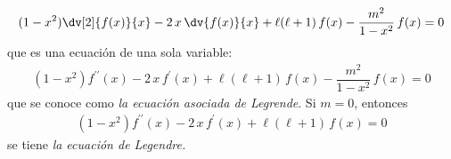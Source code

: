 \begin{align*}
(1 - x^{2}) \dv[2]{f(x)}{x} - 2 \, x \, \dv{f(x)}{x} + \ell (\ell +1 ) \, f(x)  - \dfrac{m^{2}}{1 - x^{2}} \, f(x) = 0
\end{align*}
que es una ecuación de una sola variable:
\begin{align*}
(1 - x^{2}) f^{\prime \prime}(x) - 2 \, x \, f^{\prime}(x) + \ell (\ell +1 ) \, f(x)  - \dfrac{m^{2}}{1 - x^{2}} \, f(x) = 0
\end{align*}
que se conoce como \emph{la ecuación asociada de Legrende}. Si $m=0$, entonces
\begin{align*}
(1 - x^{2}) f^{\prime \prime}(x) - 2 \, x \, f^{\prime}(x) + \ell (\ell +1 ) \, f(x) = 0
\end{align*}
se tiene \emph{la ecuación de Legendre.}
